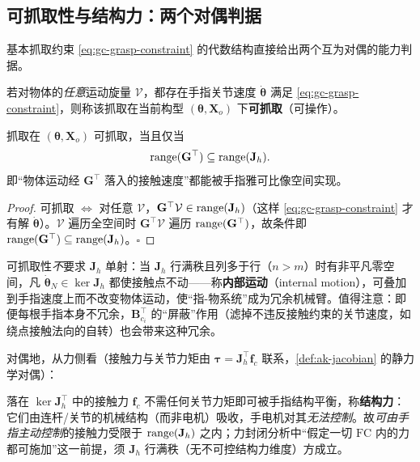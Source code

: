 \subsection{可抓取性与结构力：两个对偶判据}
\label{sec:gc-manip-structural}

基本抓取约束 \cref{eq:gc-grasp-constraint} 的代数结构直接给出两个互为对偶的能力判据。

\begin{definition}
\label{def:gc-manipulable}
若对物体的\emph{任意}运动旋量 $\mathcal{V}$，都存在手指关节速度 $\dot{\boldsymbol{\theta}}$ 满足 \cref{eq:gc-grasp-constraint}，则称该抓取在当前构型 $(\boldsymbol{\theta},\mathbf{X}_o)$ 下\textbf{可抓取}（可操作）。
\end{definition}

\begin{proposition}[可抓取性的秩判据]
\label{prop:gc-manipulable}
抓取在 $(\boldsymbol{\theta},\mathbf{X}_o)$ 可抓取，当且仅当
\begin{equation}
  \operatorname{range}(\mathbf{G}^\top)\subseteq\operatorname{range}(\mathbf{J}_h).
  \label{eq:gc-manipulable}
\end{equation}
即“物体运动经 $\mathbf{G}^\top$ 落入的接触速度”都能被手指雅可比像空间实现。
\end{proposition}
\begin{proof}
可抓取 $\Leftrightarrow$ 对任意 $\mathcal{V}$，$\mathbf{G}^\top\mathcal{V}\in\operatorname{range}(\mathbf{J}_h)$（这样 \cref{eq:gc-grasp-constraint} 才有解 $\dot{\boldsymbol{\theta}}$）。$\mathcal{V}$ 遍历全空间时 $\mathbf{G}^\top\mathcal{V}$ 遍历 $\operatorname{range}(\mathbf{G}^\top)$，故条件即 $\operatorname{range}(\mathbf{G}^\top)\subseteq\operatorname{range}(\mathbf{J}_h)$。$\square$
\end{proof}

\noindent 可抓取性\emph{不}要求 $\mathbf{J}_h$ 单射：当 $\mathbf{J}_h$ 行满秩且列多于行（$n>m$）时有非平凡零空间，凡 $\dot{\boldsymbol{\theta}}_N\in\ker\mathbf{J}_h$ 都使接触点不动——称\textbf{内部运动}（internal motion），可叠加到手指速度上而不改变物体运动，使“指-物系统”成为冗余机械臂。值得注意：即便每根手指本身不冗余，$\mathbf{B}_{c_i}^\top$ 的“屏蔽”作用（滤掉不违反接触约束的关节速度，如绕点接触法向的自转）也会带来这种冗余。

对偶地，从力侧看（接触力与关节力矩由 $\boldsymbol{\tau}=\mathbf{J}_h^\top\mathbf{f}_c$ 联系，\cref{def:ak-jacobian} 的静力学对偶）：

\begin{proposition}
\label{prop:gc-structural}
落在 $\ker\mathbf{J}_h^\top$ 中的接触力 $\mathbf{f}_c$ 不需任何关节力矩即可被手指结构平衡，称\textbf{结构力}：它们由连杆/关节的机械结构（而非电机）吸收，手电机对其\emph{无法控制}。故\emph{可由手指主动控制}的接触力受限于 $\operatorname{range}(\mathbf{J}_h)$ 之内；力封闭分析中“假定一切 $\mathrm{FC}$ 内的力都可施加”这一前提，须 $\mathbf{J}_h$ 行满秩（无不可控结构力维度）方成立。
\end{proposition}

